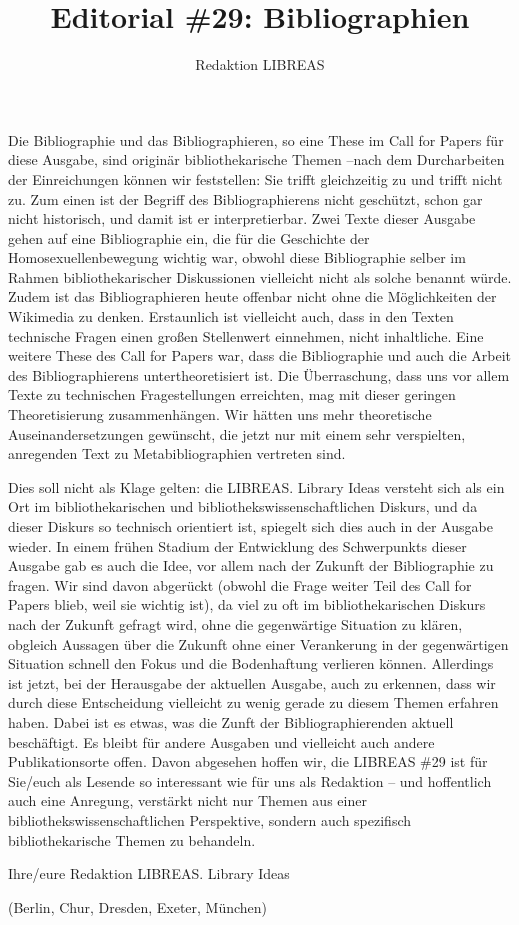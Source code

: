 \documentclass[a4paper,
fontsize=11pt,
oneside,
numbers=noperiodatend,
parskip=half-,
bibliography=totoc,
final
]{scrartcl}
\title{\LARGE{Editorial \#29: Bibliographien}} %
\author{Redaktion LIBREAS} %
\date{}
\begin{document}
\maketitle
\thispagestyle{fancyplain} 


Die Bibliographie und das Bibliographieren, so eine These im Call for
Papers für diese Ausgabe, sind originär bibliothekarische Themen --nach
dem Durcharbeiten der Einreichungen können wir feststellen: Sie trifft
gleichzeitig zu und trifft nicht zu. Zum einen ist der Begriff des
Bibliographierens nicht geschützt, schon gar nicht historisch, und damit
ist er interpretierbar. Zwei Texte dieser Ausgabe gehen auf eine
Bibliographie ein, die für die Geschichte der Homosexuellenbewegung
wichtig war, obwohl diese Bibliographie selber im Rahmen
bibliothekarischer Diskussionen vielleicht nicht als solche benannt
würde. Zudem ist das Bibliographieren heute offenbar nicht ohne die
Möglichkeiten der Wikimedia zu denken. Erstaunlich ist vielleicht auch,
dass in den Texten technische Fragen einen großen Stellenwert einnehmen,
nicht inhaltliche. Eine weitere These des Call for Papers war, dass die
Bibliographie und auch die Arbeit des Bibliographierens
untertheoretisiert ist. Die Überraschung, dass uns vor allem Texte zu
technischen Fragestellungen erreichten, mag mit dieser geringen
Theoretisierung zusammenhängen. Wir hätten uns mehr theoretische
Auseinandersetzungen gewünscht, die jetzt nur mit einem sehr
verspielten, anregenden Text zu Metabibliographien vertreten sind.

Dies soll nicht als Klage gelten: die LIBREAS. Library Ideas versteht
sich als ein Ort im bibliothekarischen und bibliothekswissenschaftlichen
Diskurs, und da dieser Diskurs so technisch orientiert ist, spiegelt
sich dies auch in der Ausgabe wieder. In einem frühen Stadium der
Entwicklung des Schwerpunkts dieser Ausgabe gab es auch die Idee, vor
allem nach der Zukunft der Bibliographie zu fragen. Wir sind davon
abgerückt (obwohl die Frage weiter Teil des Call for Papers blieb, weil
sie wichtig ist), da viel zu oft im bibliothekarischen Diskurs nach der
Zukunft gefragt wird, ohne die gegenwärtige Situation zu klären,
obgleich Aussagen über die Zukunft ohne einer Verankerung in der
gegenwärtigen Situation schnell den Fokus und die Bodenhaftung verlieren
können. Allerdings ist jetzt, bei der Herausgabe der aktuellen Ausgabe,
auch zu erkennen, dass wir durch diese Entscheidung vielleicht zu wenig
gerade zu diesem Themen erfahren haben. Dabei ist es etwas, was die
Zunft der Bibliographierenden aktuell beschäftigt. Es bleibt für andere
Ausgaben und vielleicht auch andere Publikationsorte offen. Davon
abgesehen hoffen wir, die LIBREAS \#29 ist für Sie/euch als Lesende so
interessant wie für uns als Redaktion -- und hoffentlich auch eine
Anregung, verstärkt nicht nur Themen aus einer
bibliothekswissenschaftlichen Perspektive, sondern auch spezifisch
bibliothekarische Themen zu behandeln.

Ihre/eure Redaktion LIBREAS. Library Ideas

(Berlin, Chur, Dresden, Exeter, München)

\end{document}

